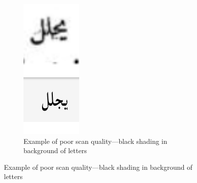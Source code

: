 \begin{figure}
\begin{subfigure}[b]{0.9\linewidth}
	\includegraphics[width=\textwidth]{images/image14.png}
	\caption{Example of poor scan quality—black shading in background of letters}
	\label{fig:fig27}
	\end{subfigure}


\end{figure}
